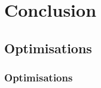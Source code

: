 \documentclass{beamer}
\begin{document}
\section{Conclusion}
\subsection{Optimisations}
 \begin{frame}
   \frametitle{Optimisations}

\end{frame}


\end{document}
